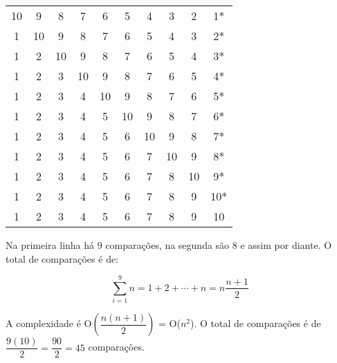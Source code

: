\begin{center}
    \begin{tabular}{cccccccccc}
      10 & 9 & 8 & 7 & 6 & 5 & 4 & 3& 2 & 1* \\
      1 & 10 & 9 & 8 & 7 & 6 & 5 & 4 & 3& 2*  \\
      1 & 2 & 10 & 9 & 8 & 7 & 6 & 5 & 4 & 3*  \\
      1 & 2 & 3 & 10 & 9 & 8 & 7 & 6 & 5 & 4* \\
      1 & 2 & 3 & 4 & 10 & 9 & 8 & 7 & 6 & 5* \\
      1 & 2 & 3 & 4 & 5 & 10 & 9 & 8 & 7 & 6* \\
      1 & 2 & 3 & 4 & 5 & 6 & 10 & 9 & 8 & 7* \\
      1 & 2 & 3 & 4 & 5 & 6 & 7 & 10 & 9 & 8* \\
      1 & 2 & 3 & 4 & 5 & 6 & 7 & 8 & 10 & 9* \\
      1 & 2 & 3 & 4 & 5 & 6 & 7 & 8 & 9 & 10* \\
      1 & 2 & 3 & 4 & 5 & 6 & 7 & 8 & 9 & 10
    \end{tabular}
\end{center}

Na primeira linha há 9 comparações, na segunda são 8 e assim por diante. O total de comparações é de:

\[ \sum_{i=1}^9 n = 1 + 2 + \cdots + n = n\frac{n+1}{2}\]

A complexidade é  O$\left(\dfrac{n(n+1)}{2}\right)$ = O($n^2$). O total de comparações é de $\dfrac{9(10)}{2} = \dfrac{90}{2} = 45$ comparações.
    